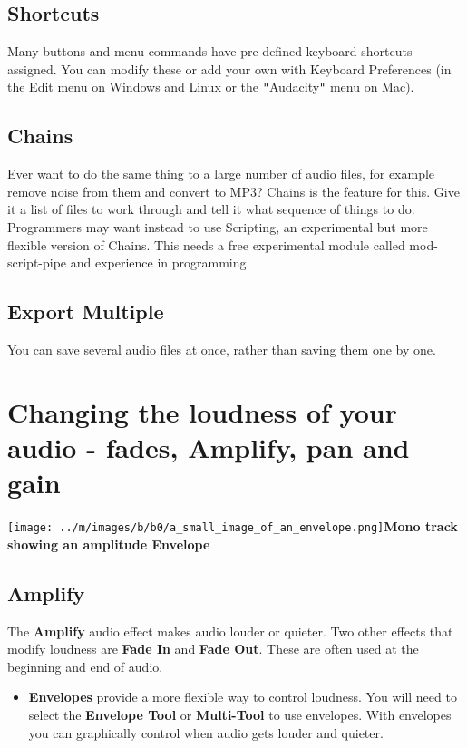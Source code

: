 \documentclass[twocolumn]{book}
\begin{document}
\subsection{Shortcuts}


Many buttons and menu commands have pre-defined keyboard shortcuts assigned.  You can modify these or add your own with Keyboard Preferences (in the Edit menu on Windows and Linux or the \texttt{{}"{}}Audacity\texttt{{}"{}} menu on Mac). 

\subsection{Chains}


Ever want to do the same thing to a large number of audio files, for example remove noise from them and convert to MP3?  Chains is the feature for this. Give it a list of files to work through and tell it what sequence of things to do. Programmers may want instead to use Scripting, an experimental but more flexible version of Chains. This needs a free experimental module called mod-script-pipe and experience in programming.

\subsection{Export Multiple}


You can save several audio files at once, rather than saving them one by one.



\section{Changing the loudness of your audio - fades, Amplify, pan and gain}

\texttt{[image: ../m/images/b/b0/a\_small\_image\_of\_an\_envelope.png]}\textbf{Mono track showing an amplitude Envelope}

\subsection{Amplify}


The \textbf{Amplify} audio effect makes audio louder or quieter.  Two other effects that modify loudness are \textbf{Fade In} and \textbf{Fade Out}.  These are often used at the beginning and end of audio. 
\begin{itemize}
\item  \textbf{Envelopes} provide a more flexible way to control loudness.  You will need to select the \textbf{Envelope Tool} or \textbf{Multi-Tool} to use envelopes.  With envelopes you can graphically control when audio gets louder and quieter.
\end{itemize}
\end{document}
